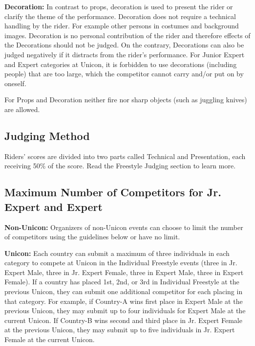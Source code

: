 \textbf{Decoration:} In contrast to props, decoration is used to present the rider or clarify the theme of the performance.
Decoration does not require a technical handling by the rider.
For example other persons in costumes and background images.
Decoration is no personal contribution of the rider and therefore effects of the Decorations should not be judged.
On the contrary, Decorations can also be judged negatively if it distracts from the rider’s performance.
For Junior Expert and Expert categories at Unicon, it is forbidden to use decorations (including people) that are too large, which the competitor cannot carry and/or put on by oneself. 

For Props and Decoration neither fire nor sharp objects (such as juggling knives) are allowed.

\subsection{Judging Method}
Riders' scores are divided into two parts called Technical and Presentation, each receiving 50\% of the score.
Read the Freestyle Judging section to learn more.

\subsection{Maximum Number of Competitors for Jr. Expert and Expert}
\textbf{Non-Unicon:} Organizers of non-Unicon events can choose to limit the number of competitors using the guidelines below or have no limit.

\textbf{Unicon:} Each country can submit a maximum of three individuals in each category to compete at Unicon in the Individual Freestyle events (three in Jr. Expert Male, three in Jr. Expert Female, three in Expert Male, three in Expert Female).
If a country has placed 1st, 2nd, or 3rd in Individual Freestyle at the previous Unicon, they can submit one additional competitor for each placing in that category.
For example, if Country-A wins first place in Expert Male at the previous Unicon, they may submit up to four individuals for Expert Male at the current Unicon.
If Country-B wins second and third place in Jr. Expert Female at the previous Unicon, they may submit up to five individuals in Jr. Expert Female at the current Unicon.

